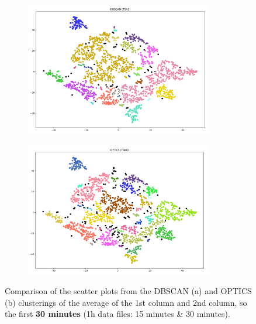 \begin{figure}[H]
	\centering
	\begin{subfigure}{.5\textwidth}
    \centering
    \includegraphics[width=0.9\textwidth]{./images/clusteringResults/1h-2-DBSCAN.png}
  \end{subfigure}%
  \begin{subfigure}{.5\textwidth}
    \centering
    \includegraphics[width=0.9\textwidth]{./images/clusteringResults/1h-2-OPTICS.png}
	\end{subfigure}
	\caption{Comparison of the scatter plots from the DBSCAN (a) and OPTICS (b) clusterings of the average of the 1st column and 2nd column, so the first \textbf{30 minutes} (1h data files: 15 minutes \& 30 minutes).}
  \label{figure:finalClustering1h-2}
\end{figure}

